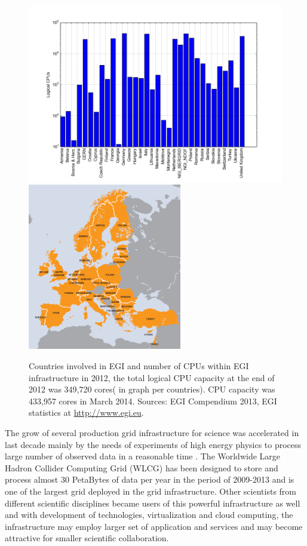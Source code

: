 \begin{figure}[htb]
    \centering
    \includegraphics[width=1\textwidth]{chapter2/egicpus.png}
    \includegraphics[width=0.6\textwidth]{chapter2/egi.png}
    \caption{Countries involved in EGI and number of CPUs within EGI infrastructure in 2012, the total logical CPU capacity at the end of 2012 was 349,720 cores( in graph per countries). CPU capacity was 433,957 cores in March 2014. Sources: EGI Compendium 2013, EGI statistics at \url{http://www.egi.eu}.%
    }
    \label{fig:egi}
\end{figure}

The grow of several production grid infrastructure for science was accelerated in last decade mainly by the needs of experiments of high energy physics to process large number of observed data in a reasonable time \cite{Bird2009}. The Worldwide Large Hadron Collider Computing Grid (WLCG) has been designed to store and process almost 30 PetaBytes of data per year in the period of 2009-2013  \cite{Adamova2014} and is one of the largest grid deployed in the grid infrastructure. Other scientists from different scientific disciplines became users of this powerful infrastructure as well and with development of technologies, virtualization and cloud computing, the infrastructure may employ larger set of application and services and may become attractive for smaller scientific collaboration.

